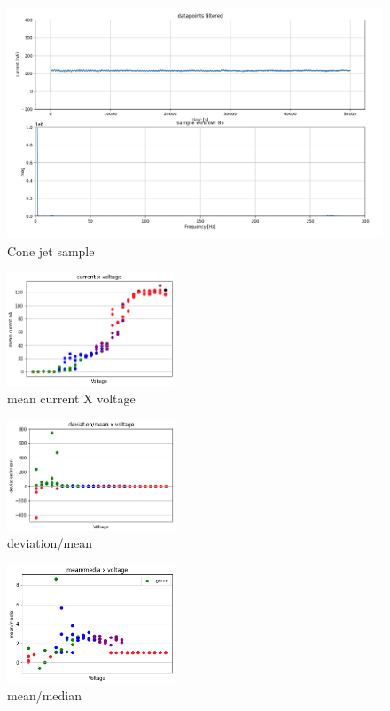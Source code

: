 \begin{figure}[H]
    \center
    \includegraphics[width=15cm]{images/images_folder_2/img3.png}
    \caption{Cone jet sample}
\end{figure}

\begin{multicols}{3}

    \begin{figure}[H]
        \center
        \includegraphics[width=5cm]{images/images_folder_3/data2_sjaaksgraph1.png}
        \caption{mean current X voltage}
    \end{figure}


    \begin{figure}[H]
        \center
        \includegraphics[width=5cm]{images/images_folder_3/data2_sjaaksgraph2.png}
        \caption{deviation/mean}
    \end{figure}


    \begin{figure}[H]
        \center
        \includegraphics[width=5cm]{images/images_folder_3/data2_sjaaksgraph3.png}
        \caption{mean/median}
    \end{figure}

\end{multicols}

